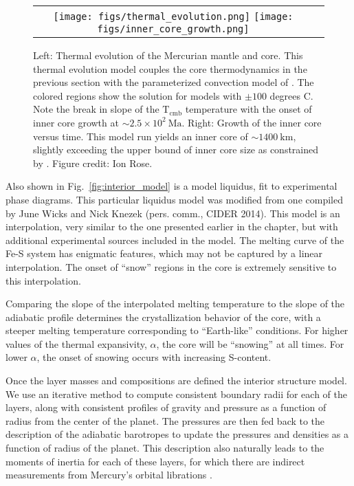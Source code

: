  \begin{figure}[h] %
   \centering
\begin{tabular}{cc}
 \texttt{[image: figs/thermal\_evolution.png]}
 \texttt{[image: figs/inner\_core\_growth.png]}
\end{tabular}
\caption{Left: Thermal evolution of the Mercurian mantle and core. This
  thermal evolution model couples the core thermodynamics in the previous section
  with the parameterized convection model of \citep{Stevenson1983}. The colored
  regions show the solution for models with $\pm \mathrm{100}$ degrees C. Note the
  break in slope of the $\mathrm{T_{cmb}}$ temperature with the onset of inner core
  growth at $\sim 2.5\times10^2~\mathrm{Ma}$. Right: Growth of the inner core versus
  time. This model run yields an inner core of $ \sim 1400~\mathrm{km}$, slightly
  exceeding the upper bound of inner core size as constrained by \citep{Dumberry2015}.
  Figure credit: Ion Rose.}
  \label{fig:thermal}
\end{figure}

Also shown in Fig.~\ref{fig:interior_model} is a model liquidus, fit to experimental
phase diagrams. This particular liquidus model was modified from one compiled by June
Wicks and Nick Knezek (pers. comm., CIDER 2014). This model is an interpolation, very
similar to the one presented earlier in the chapter, but with additional experimental
sources included in the model. The melting curve of the Fe-S system has enigmatic
features, which may not be captured by a  linear interpolation. The onset of ``snow''
regions in the core is extremely sensitive to this interpolation. 

Comparing the slope of the interpolated melting temperature to the slope of the
adiabatic profile determines the crystallization behavior of the core, with a
steeper melting temperature corresponding to  ``Earth-like'' conditions. For higher
values of the thermal expansivity, $\alpha$, the core will be ``snowing'' at all
times. For lower $\alpha$, the onset of snowing occurs with increasing S-content.

Once the layer masses and compositions are defined the interior structure model. We
use an iterative method to compute consistent boundary radii for each of the layers,
along with consistent profiles of gravity and pressure as a function of radius from
the center of the planet. The pressures are then fed back to the description of the
adiabatic barotropes to update the pressures and densities as a function of radius of
the planet. This description also naturally leads to the moments of inertia for each
of these layers, for which there are indirect measurements from Mercury's orbital librations
\citep{Margot}.


